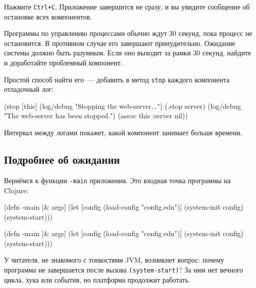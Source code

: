 Нажмите \verb|Ctrl+C|. Приложение завершится не сразу, и вы увидите сообщение
об остановке всех компонентов.

Программы по управлению процессами обычно ждут 30 секунд, пока процесс не
остановится. В противном случае его завершают принудительно. Ожидание системы
должно быть разумным. Если оно выходит за рамки 30 секунд, найдите и доработайте
проблемный компонент.

Простой способ найти его~--- добавить в метод \verb|stop| каждого компонента
отладочный лог:

\begin{english}
  \begin{clojure}
(stop [this]
  (log/debug "Stopping the web-server...")
  (.stop server)
  (log/debug "The web-server has been stopped.")
  (assoc this :server nil))
  \end{clojure}
\end{english}

Интервал между логами покажет, какой компонент занимает больше времени.

\subsection{Подробнее об ожидании}


Вернёмся к функции \verb|-main| приложения. Это входная точка программы на
Clojure:

\ifx\DEVICETYPE\MOBILE

\begin{english}
  \begin{clojure}
(defn -main [& args]
  (let [config
        (load-config "config.edn")]
    (system-init config)
    (system-start)))
  \end{clojure}
\end{english}

\else

\begin{english}
  \begin{clojure}
(defn -main [& args]
  (let [config (load-config "config.edn")]
    (system-init config)
    (system-start)))
  \end{clojure}
\end{english}

\fi

У читателя, не знакомого с тонкостями JVM, возникнет вопрос: почему программа не
завершается после вызова \verb|(system-start)|? За ним нет вечного цикла, хука
или события, но платформа продолжит работать.

